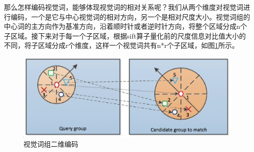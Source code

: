 那么怎样编码视觉词，能够体现视觉词的相对关系呢？我们从两个维度对视觉词进行编码，一个是它与中心视觉词的相对方向，另一个是相对尺度大小。视觉词组的中心词的主方向作为基准方向，沿着顺时针或者逆时针方向，将整个区域分成n个子区域。接下来对于每一个子区域，根据sift算子量化前的尺度信息对比值大小的不同，将子区域分成r个维度，这样一个视觉词共有n*r个子区域，如图\ref{fig:visual_group}所示。

\begin{figure}
\centering\includegraphics[width=15.00cm]{imgs/ch3/visual_group}
\caption{视觉词组二维编码}
\label{fig:visual_group}
\end{figure}


\ifx\usechapbib\empty
\nocite{BSTcontrol}


\fi